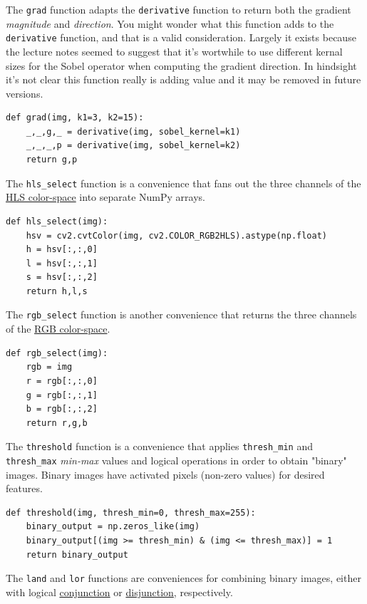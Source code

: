 \documentclass[11pt]{article}
\begin{document}
The \texttt{grad} function adapts the \texttt{derivative} function to return
both the gradient \emph{magnitude} and \emph{direction}.  You might wonder
what this function adds to the \texttt{derivative} function, and that
is a valid consideration.  Largely it exists because the lecture
notes seemed to suggest that it's wortwhile to use different
kernal sizes for the Sobel operator when computing the gradient
direction.  In hindsight it's not clear this function really is
adding value and it may be removed in future versions.

\begin{verbatim}
def grad(img, k1=3, k2=15):
    _,_,g,_ = derivative(img, sobel_kernel=k1)
    _,_,_,p = derivative(img, sobel_kernel=k2)
    return g,p
\end{verbatim}

The \texttt{hls\_select} function is a convenience that fans out the
three channels of the \href{https://en.wikipedia.org/wiki/HSL_and_HSV}{HLS color-space} into separate NumPy
arrays.  

\begin{verbatim}
def hls_select(img):
    hsv = cv2.cvtColor(img, cv2.COLOR_RGB2HLS).astype(np.float)
    h = hsv[:,:,0]
    l = hsv[:,:,1]
    s = hsv[:,:,2]
    return h,l,s
\end{verbatim}

The \texttt{rgb\_select} function is another convenience that returns
the three channels of the \href{https://en.wikipedia.org/wiki/RGB_color_space}{RGB color-space}.

\begin{verbatim}
def rgb_select(img):
    rgb = img
    r = rgb[:,:,0]
    g = rgb[:,:,1]
    b = rgb[:,:,2]
    return r,g,b
\end{verbatim}

The \texttt{threshold} function is a convenience that applies
\texttt{thresh\_min} and \texttt{thresh\_max} \emph{min-max} values and logical
operations in order to obtain "binary" images.  Binary images
have activated pixels (non-zero values) for desired features.

\begin{verbatim}
def threshold(img, thresh_min=0, thresh_max=255):
    binary_output = np.zeros_like(img)
    binary_output[(img >= thresh_min) & (img <= thresh_max)] = 1
    return binary_output
\end{verbatim}

The \texttt{land} and \texttt{lor} functions are conveniences for combining
binary images, either with logical \href{https://en.wikipedia.org/wiki/Logical_conjunction}{conjunction} or \href{https://en.wikipedia.org/wiki/Logical_disjunction}{disjunction},
respectively.  
\end{document}
